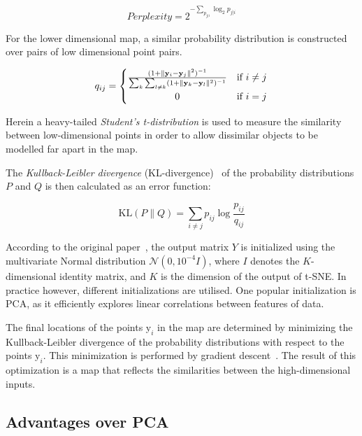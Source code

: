 \begin{equation}
	\label{eq:tsne:perlexity}
	Perplexity = 2^{-\sum_{p_{j|i}} \log_2 p_{j|i}}
\end{equation}

For the lower dimensional map, a similar probability distribution is constructed over pairs of low dimensional point pairs.

\begin{equation}
	\label{eq:tsne:qij}
	q_{ij} =
	\begin{cases}
		{\frac{(1+\lVert \mathbf{y}_{i} - \mathbf{y}_{j}\rVert^{2})^{-1}}{\sum_{k}\sum_{l \neq k}(1+\lVert \mathbf{y}_{k} - \mathbf{y}_{l}\rVert ^{2})^{-1}}} & \textrm{if } i \neq j \\
		\hfil 0 & \textrm{if } i = j
	\end{cases}
\end{equation}

Herein a heavy-tailed \textit{Student's t-distribution} is used to measure the similarity between low-dimensional points in order to allow dissimilar objects to be modelled far apart in the map.

The \textit{Kullback-Leibler divergence} (KL-divergence)~\cite{bib:kldiv} of the probability distributions $P$ and $Q$ is then calculated as an error function:

\begin{equation}
	\label{eq:KLdiv}
 	\mathrm{KL} \left(P \parallel Q \right) = \sum_{i\neq j} p_{ij} \log{\frac{p_{ij}}{q_{ij}}}
\end{equation}

According to the original paper~\cite{bib:tsne}, the output matrix $Y$ is initialized using the multivariate Normal distribution  $\mathcal{N}(0,10^{-4}I)$, where $I$ denotes the $K$-dimensional identity matrix, and $K$ is the dimension of the output of t-SNE. In practice however, different initializations are utilised. One popular initialization is PCA, as it efficiently explores linear correlations between features of data.

The final locations of the points $\mathrm{y}_i$ in the map are determined by minimizing the Kullback-Leibler divergence of the probability distributions with respect to the points $\mathrm{y}_i$. This minimization is performed by gradient descent~\cite{bib:gd}. The result of this optimization is a map that reflects the similarities between the high-dimensional inputs.

\subsection{Advantages over PCA}

